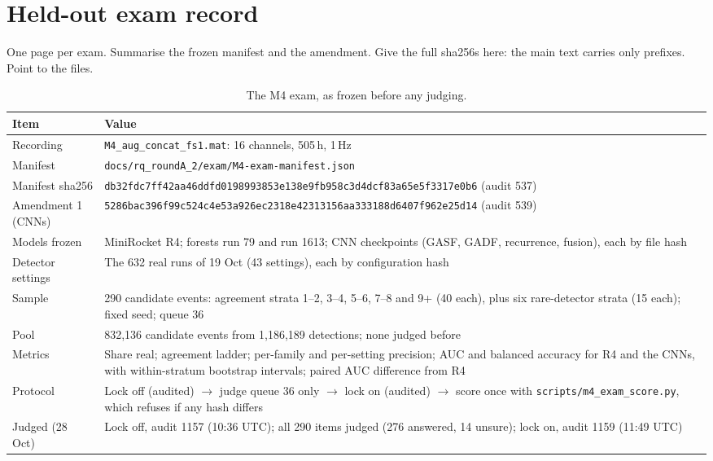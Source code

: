 \chapter{Held-out exam record}
\label{app:exam}

\begin{instructions}
One page per exam. Summarise the frozen manifest and the amendment. Give the full sha256s here: the main text carries
only prefixes. Point to the files.
\end{instructions}

\begin{table}[htbp]
\caption[{The M4 exam, as frozen before any judging.}]{The M4 exam, as frozen before any judging.}
\label{tab:examrecord}
\footnotesize
\begin{tabularx}{\textwidth}{p{3.4cm} X}
\toprule
\textbf{Item} & \textbf{Value}\\
\midrule
Recording & \texttt{M4\_aug\_concat\_fs1.mat}: 16 channels, 505\,h, 1\,Hz\\
Manifest & \texttt{docs/rq\_roundA\_2/exam/M4-exam-manifest.json}\\
Manifest sha256 & \texttt{db32fdc7ff42aa46ddfd0198993853e138e9fb958c3d4dcf83a65e5f3317e0b6} (audit 537)\\
Amendment 1 (CNNs) & \texttt{5286bac396f99c524c4e53a926ec2318e42313156aa333188d6407f962e25d14} (audit 539)\\
Models frozen & MiniRocket R4; forests run 79 and run 1613; CNN checkpoints (GASF, GADF, recurrence, fusion), each by file hash\\
Detector settings & The 632 real runs of 19 Oct (43 settings), each by configuration hash\\
Sample & 290 candidate events: agreement strata 1--2, 3--4, 5--6, 7--8 and 9+ (40 each), plus six rare-detector strata (15 each); fixed seed; queue 36\\
Pool & 832,136 candidate events from 1,186,189 detections; none judged before\\
Metrics & Share real; agreement ladder; per-family and per-setting precision; AUC and balanced accuracy for R4 and the CNNs, with within-stratum bootstrap intervals; paired AUC difference from R4\\
Protocol & Lock off (audited) $\rightarrow$ judge queue 36 only $\rightarrow$ lock on (audited) $\rightarrow$ score once with \texttt{scripts/m4\_exam\_score.py}, which refuses if any hash differs\\
\midrule
Judged (28 Oct) & Lock off, audit 1157 (10:36 UTC); all 290 items judged (276 answered, 14 unsure); lock on, audit 1159 (11:49 UTC)\\

\end{tabularx}
\end{table}
